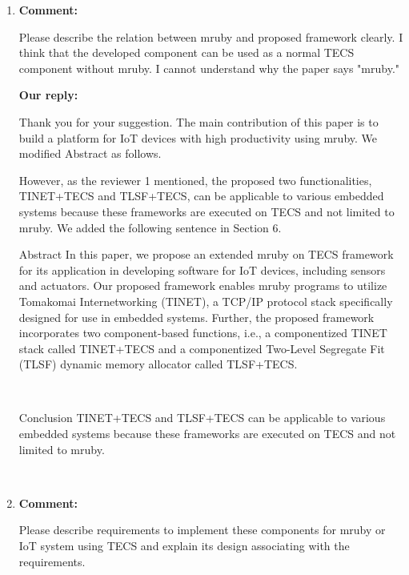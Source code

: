 \documentclass{article}
\begin{document}
\begin{enumerate}

\item \begin{flushleft}
\textbf{Comment:}

Please describe the relation between mruby and proposed framework clearly. I think that the developed component can be used as a normal TECS component without mruby. I cannot understand why the paper says "mruby." 
\end{flushleft}

\begin{flushleft}
\textbf{Our reply:}

Thank you for your suggestion.
The main contribution of this paper is to build a platform for IoT devices with high productivity using mruby.
We modified Abstract as follows. 

However, as the reviewer 1 mentioned, the proposed two functionalities, TINET+TECS and TLSF+TECS, can be applicable to various embedded systems because these frameworks are executed on TECS and not limited to mruby.
We added the following sentence in Section 6.

\begin{itembox}[|]{Abstract}
In this paper, we propose an extended mruby on TECS framework for its application in developing software for IoT devices, including sensors and actuators. Our proposed framework enables mruby programs to utilize Tomakomai Internetworking (TINET), a TCP/IP protocol stack specifically designed for use in embedded systems. Further, the proposed framework incorporates two component-based functions, i.e., a componentized TINET stack called TINET+TECS and a componentized Two-Level Segregate Fit (TLSF) dynamic memory allocator called TLSF+TECS.
\end{itembox}\\


\begin{itembox}[|]{Conclusion}
TINET+TECS and TLSF+TECS can be applicable to various embedded systems because these frameworks are executed on TECS and not limited to mruby.
\end{itembox}\\

\end{flushleft}


\item \begin{flushleft}
\textbf{Comment:}

Please describe requirements to implement these components for mruby or IoT system using TECS and explain its design associating with the requirements. 
\end{flushleft}


\end{enumerate}
\end{document}
